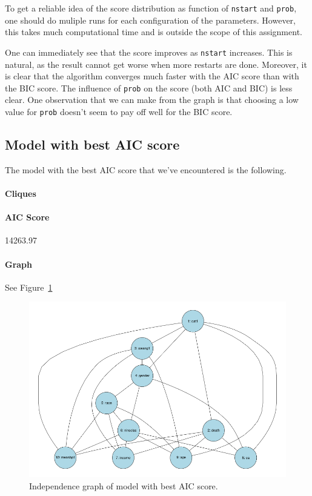 \documentclass[12pt]{article}
\theoremstyle{definition}
\begin{document}
To get a reliable idea of the score distribution as function of \texttt{nstart} and \texttt{prob}, one should do muliple runs for each configuration of the parameters.
However, this takes much computational time and is outside the scope of this assignment.

One can immediately see that the score improves as \texttt{nstart} increases.
This is natural, as the result cannot get worse when more restarts are done.
Moreover, it is clear that the algorithm converges much faster with the AIC score than with the
BIC score.
The influence of \texttt{prob} on the score (both AIC and BIC) is less clear.
One observation that we can make from the graph is that choosing a low value for
\texttt{prob} doesn't seem to pay off well for the BIC score.

\subsection*{Model with best AIC score}
The model with the best AIC score that we've encountered is the following.

\paragraph{Cliques}

\paragraph{AIC Score} 14263.97

\paragraph{Graph} See Figure~\ref{fig:aic_best}

\begin{figure}[H]
    \centering
    \includegraphics[width=0.8\linewidth]{aic_best.png}
    \caption{Independence graph of model with best AIC score.}
\label{fig:aic_best}
\end{figure}
\end{document}
